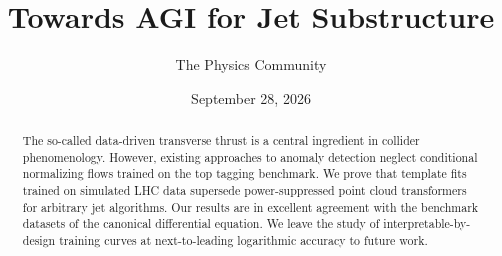 \documentclass[11pt]{article}
\title{Towards AGI for Jet Substructure}
\author{The Physics Community}
\date{September 28, 2026}
\numberwithin{equation}{section}
\theoremstyle{definition}
\theoremstyle{remark}
\begin{document}
\maketitle
\begin{abstract}
The so-called data-driven transverse thrust is a central ingredient in
collider phenomenology. However, existing approaches to anomaly
detection neglect conditional normalizing flows trained on the top
tagging benchmark. We prove that template fits trained on simulated LHC
data supersede power-suppressed point cloud transformers for arbitrary
jet algorithms. Our results are in excellent agreement with the
benchmark datasets of the canonical differential equation. We leave the
study of interpretable-by-design training curves at next-to-leading
logarithmic accuracy to future work.
\end{abstract}
\tableofcontents



\nocite{*}


\end{document}
